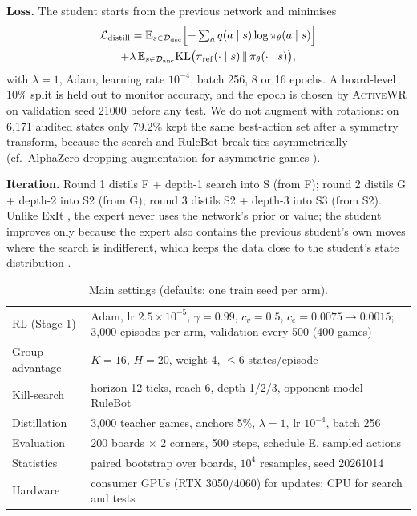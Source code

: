 \documentclass[11pt]{article}
\newcommand{\awr}{\textsc{ActiveWR}}
\begin{document}
\textbf{Loss.} The student starts from the previous network and minimises
\begin{multline}
\mathcal{L}_{\mathrm{distill}}=\mathbb{E}_{s\in\mathcal{D}_{\mathrm{dec}}}\Bigl[-\textstyle\sum_a q(a\mid s)\log\pi_\theta(a\mid s)\Bigr]\\
+\lambda\,\mathbb{E}_{s\in\mathcal{D}_{\mathrm{anc}}}\mathrm{KL}\bigl(\pi_{\mathrm{ref}}(\cdot\mid s)\,\Vert\,\pi_\theta(\cdot\mid s)\bigr),
\end{multline}
with $\lambda=1$, Adam, learning rate $10^{-4}$, batch 256, 8 or 16 epochs. A board-level 10\% split is held out to monitor accuracy, and the epoch is chosen by \awr{} on validation seed 21000 before any test. We do not augment with rotations: on 6{,}171 audited states only 79.2\% kept the same best-action set after a symmetry transform, because the search and RuleBot break ties asymmetrically (cf.\ AlphaZero dropping augmentation for asymmetric games \cite{silver2017alphazero}).

\textbf{Iteration.} Round 1 distils F + depth-1 search into S (from F); round 2 distils G + depth-2 into S2 (from G); round 3 distils S2 + depth-3 into S3 (from S2). Unlike ExIt \cite{anthony2017exit}, the expert never uses the network's prior or value; the student improves only because the expert also contains the previous student's own moves where the search is indifferent, which keeps the data close to the student's state distribution \cite{ross2011dagger}.

\begin{table}[t]
\centering
\caption{Main settings (defaults; one train seed per arm).}
\label{tab:hyper}
\footnotesize
\setlength{\tabcolsep}{3pt}
\begin{tabular}{@{}L{0.24\textwidth}L{0.72\textwidth}@{}}
\toprule
RL (Stage 1) & Adam, lr $2.5\times10^{-5}$, $\gamma=0.99$, $c_v=0.5$, $c_e=0.0075\rightarrow0.0015$; 3{,}000 episodes per arm, validation every 500 (400 games) \\
Group advantage & $K=16$, $H=20$, weight 4, $\le$6 states/episode \\
Kill-search & horizon 12 ticks, reach 6, depth 1/2/3, opponent model RuleBot \\
Distillation & 3{,}000 teacher games, anchors 5\%, $\lambda=1$, lr $10^{-4}$, batch 256 \\
Evaluation & 200 boards $\times$ 2 corners, 500 steps, schedule E, sampled actions \\
Statistics & paired bootstrap over boards, $10^4$ resamples, seed 20261014 \\
Hardware & consumer GPUs (RTX 3050/4060) for updates; CPU for search and tests \\
\bottomrule
\end{tabular}
\end{table}
\end{document}
